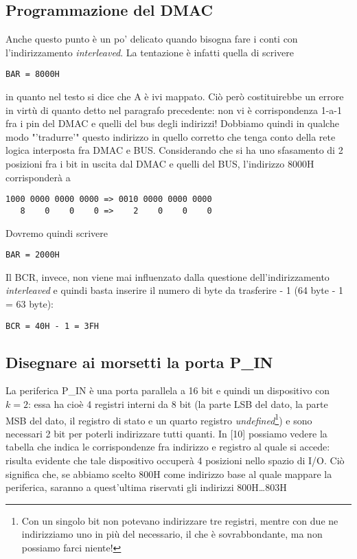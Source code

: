 \subsection{Programmazione del DMAC}

Anche questo punto è un po' delicato quando bisogna fare i conti con l'indirizzamento \textit{interleaved}. La tentazione è infatti quella di scrivere
\begin{verbatim}
BAR = 8000H
\end{verbatim}
in quanto nel testo si dice che A è ivi mappato. Ciò però costituirebbe un errore in virtù di quanto detto nel paragrafo precedente: non vi è corrispondenza 1-a-1 fra i pin del DMAC e quelli del bus degli indirizzi! Dobbiamo quindi in qualche modo "'tradurre'" questo indirizzo in quello corretto che tenga conto della rete logica interposta fra DMAC e BUS. Considerando che si ha uno sfasamento di 2 posizioni fra i bit in uscita dal DMAC e quelli del BUS, l'indirizzo 8000H corrisponderà a
\begin{verbatim}
1000 0000 0000 0000 => 0010 0000 0000 0000
   8    0    0    0 =>    2    0    0    0
\end{verbatim}
Dovremo quindi scrivere
\begin{verbatim}
BAR = 2000H
\end{verbatim}
Il BCR, invece, non viene mai influenzato dalla questione dell'indirizzamento \textit{interleaved} e quindi basta inserire il numero di byte da trasferire - 1 (64 byte - 1 = 63 byte):
\begin{verbatim}
BCR = 40H - 1 = 3FH
\end{verbatim}


\subsection{Disegnare ai morsetti la porta P\_IN}

La periferica P\_IN è una porta parallela a 16 bit e quindi un dispositivo con $k = 2$: essa ha cioè 4 registri interni da 8 bit (la parte LSB del dato, la parte MSB del dato, il registro di stato e un quarto registro \textit{undefined}\footnote{Con un singolo bit non potevano indirizzare tre registri, mentre con due ne indirizziamo uno in più del necessario, il che è sovrabbondante, ma non possiamo farci niente!}) e sono necessari 2 bit per poterli indirizzare tutti quanti. In [10] possiamo vedere la tabella che indica le corrispondenze fra indirizzo e registro al quale si accede: risulta evidente che tale dispositivo occuperà 4 posizioni nello spazio di I/O. Ciò significa che, se abbiamo scelto 800H come indirizzo base al quale mappare la periferica, saranno a quest'ultima riservati gli indirizzi 800H\ldots 803H

